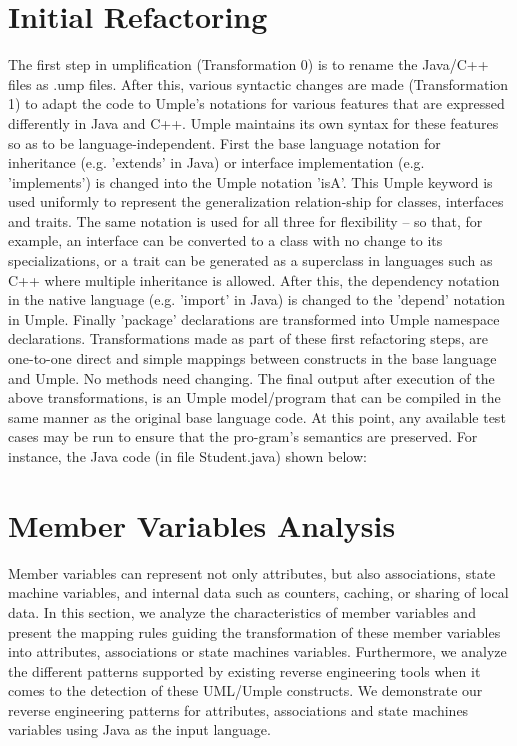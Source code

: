\section{Initial Refactoring}
The first step in umplification (Transformation 0) is to rename the Java/C++ files as .ump files. After this, various syntactic changes are made (Transformation 1) to adapt the code to Umple's notations for various features that are expressed differently in Java and C++. Umple maintains its own syntax for these features so as to be language-independent.
First the base language notation for inheritance (e.g. 'extends' in Java) or interface implementation (e.g. 'implements') is changed into the Umple notation 'isA'. This Umple keyword is used uniformly to represent the generalization relation-ship for classes, interfaces and traits. The same notation is used for all three for flexibility – so that, for example, an interface can be converted to a class with no change to its specializations, or a trait can be generated as a superclass in languages such as C++ where multiple inheritance is allowed.
After this, the dependency notation in the native language (e.g. 'import' in Java) is changed to the 'depend' notation in Umple. Finally 'package' declarations are transformed into Umple namespace declarations. 
Transformations made as part of these first refactoring steps, are one-to-one direct and simple mappings between constructs in the base language and Umple. No methods need changing. The final output after execution of the above transformations, is an Umple model/program that can be compiled in the same manner as the original base language code. At this point, any available test cases may be run to ensure that the pro-gram's semantics are preserved. For instance, the Java code (in file Student.java) shown below:	

\section{Member Variables Analysis}
Member variables can represent not only attributes, but also associations, state machine variables, and internal data such as counters, caching, or sharing of local data. In this section, we analyze the characteristics of member variables and present the mapping rules guiding the transformation of
these member variables into attributes, associations or state machines variables. Furthermore, we analyze the different patterns supported by existing reverse engineering tools when it comes to the detection of these UML/Umple constructs. We demonstrate our reverse engineering patterns for attributes, associations and state machines variables using Java as the input language.  
